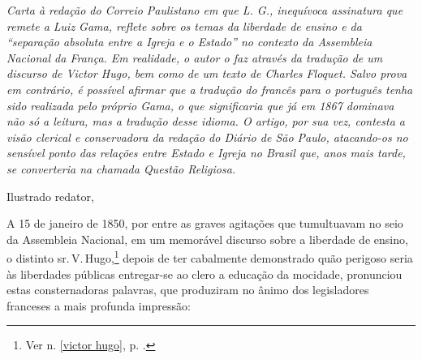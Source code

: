 \begin{didascalia}\itshape
Carta à redação do \textnormal{Correio Paulistano} em que L. G., inequívoca
assinatura que remete a Luiz Gama, reflete sobre os temas da liberdade
de ensino e da ``separação absoluta entre a Igreja e o Estado'' no
contexto da Assembleia Nacional da França. Em realidade, o autor o faz
através da tradução de um discurso de Victor Hugo, bem como de um texto
de Charles Floquet. Salvo prova em contrário, é possível afirmar que a
tradução do francês para o português tenha sido realizada pelo próprio
Gama, o que significaria que já em 1867 dominava não só a leitura, mas a
tradução desse idioma. O artigo, por sua vez, contesta a visão clerical
e conservadora da redação do \textnormal{Diário de São Paulo}, atacando-os no
sensível ponto das relações entre Estado e Igreja no Brasil que, anos
mais tarde, se converteria na chamada Questão Religiosa.
\end{didascalia}



Ilustrado redator,

A 15 de janeiro de 1850, por entre as graves agitações que tumultuavam
no seio da Assembleia Nacional, em um memorável discurso sobre a
liberdade de ensino, o distinto sr.\,V.\,Hugo,\footnote{Ver n. \ref{victor hugo}, 
p. \pageref{victor hugo}.} depois de ter cabalmente demonstrado quão 
perigoso seria às liberdades públicas entregar-se ao clero a educação 
da mocidade, pronunciou estas consternadoras palavras, que produziram 
no ânimo dos legisladores franceses a mais profunda impressão:

